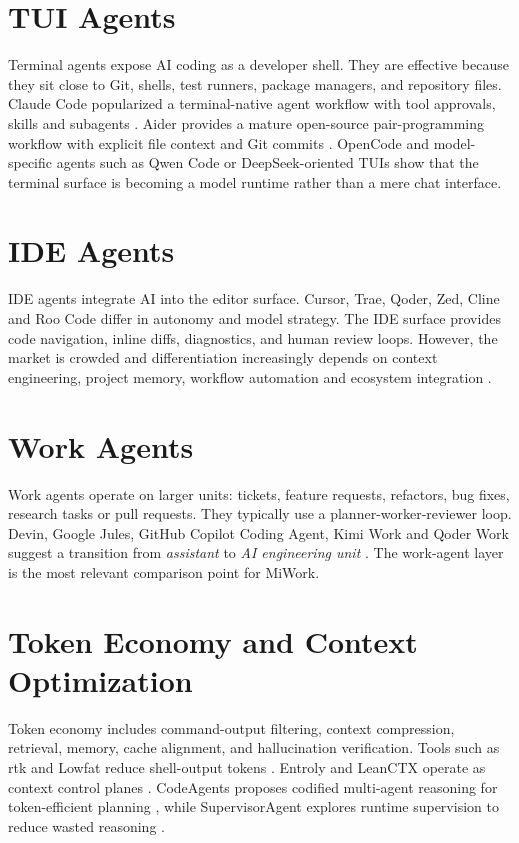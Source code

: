 \documentclass[11pt]{article}
\begin{document}
\section{TUI Agents}
Terminal agents expose AI coding as a developer shell. They are effective because they sit close to Git, shells, test runners, package managers, and repository files. Claude Code popularized a terminal-native agent workflow with tool approvals, skills and subagents \cite{anthropic_claude_code}. Aider provides a mature open-source pair-programming workflow with explicit file context and Git commits \cite{aider}. OpenCode and model-specific agents such as Qwen Code or DeepSeek-oriented TUIs show that the terminal surface is becoming a model runtime rather than a mere chat interface.

\section{IDE Agents}
IDE agents integrate AI into the editor surface. Cursor, Trae, Qoder, Zed, Cline and Roo Code differ in autonomy and model strategy. The IDE surface provides code navigation, inline diffs, diagnostics, and human review loops. However, the market is crowded and differentiation increasingly depends on context engineering, project memory, workflow automation and ecosystem integration \cite{cline,qoder,trae}.

\section{Work Agents}
Work agents operate on larger units: tickets, feature requests, refactors, bug fixes, research tasks or pull requests. They typically use a planner-worker-reviewer loop. Devin, Google Jules, GitHub Copilot Coding Agent, Kimi Work and Qoder Work suggest a transition from \emph{assistant} to \emph{AI engineering unit} \cite{devin,kimi_work,github_copilot,jules}. The work-agent layer is the most relevant comparison point for MiWork.

\section{Token Economy and Context Optimization}
Token economy includes command-output filtering, context compression, retrieval, memory, cache alignment, and hallucination verification. Tools such as rtk and Lowfat reduce shell-output tokens \cite{rtk,lowfat}. Entroly and LeanCTX operate as context control planes \cite{entroly}. CodeAgents proposes codified multi-agent reasoning for token-efficient planning \cite{codeagents2025}, while SupervisorAgent explores runtime supervision to reduce wasted reasoning \cite{supervisoragent2026}.
\end{document}
